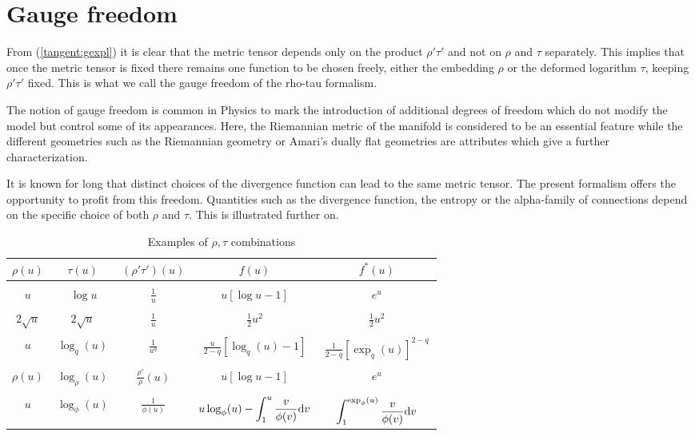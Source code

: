 \documentclass[graybox]{svmult}
\newcommand{\upd}{{\rm d}}
\begin{document}
\section{Gauge freedom}
\label{sect:gauge}


From (\ref {tangent:gexpl}) it is clear that the metric tensor depends only
on the product $\rho'\tau'$ and not on $\rho$ and $\tau$ separately.
This  implies that once the metric tensor is fixed there remains one 
function to be chosen freely, either the embedding $\rho$ or the 
deformed logarithm $\tau$, keeping $\rho'\tau'$ fixed.
This is what we call the gauge freedom of the rho-tau formalism.

The notion of gauge freedom is common in Physics to mark the
introduction of additional degrees of freedom which do not modify the model
but control some of its appearances. Here, the Riemannian metric of the
manifold is considered to be an essential feature while the different geometries
such as the Riemannian geometry or Amari's dually flat geometries are attributes
which give a further characterization.

It is known for long that distinct choices of the divergence function
can lead to the same metric tensor. The present formalism offers
the opportunity to profit from this freedom. Quantities such as
the divergence function, the entropy or the alpha-family
of connections depend on the specific choice of both $\rho$ and $\tau$.
This is illustrated further on.


\begin{table}
\begin{center}
\begin{tabular}{|c|c|c|c|c|}
\hline
$\rho(u)$\,&$\tau(u)$\, &$(\rho'\tau')(u)$\, &$f(u)$\, &$f^*(u)$\,\\\hline
 &  &  &  & \\
$u$\,&$\log u$  &$\displaystyle \frac 1u$\, &$u[\log u-1]$\, &$e^u$\,\\
 &  &  &  & \\
$2\sqrt u$\,&$2\sqrt u$\, &$\displaystyle \frac 1u$\, &$\displaystyle \frac 12 u^2$\, &$\displaystyle \frac 12 u^2$\,\\
 &  &  &  & \\
$u$\,&$\log_q (u)$\, &$\displaystyle \frac 1{u^q}$\, 
    &$\displaystyle \frac u{2-q}\left[\log_q(u)-1\right]$\, &$\frac 1{2-q}\left[\exp_q(u)\right]^{2-q}$\,\\
 &  &  &  & \\
$\rho(u)$\,&$\log_\rho(u)$\, &$\displaystyle \frac{\rho'}{\rho}(u)$\, &$u[\log u -1]$\, &$e^u$\,\\
 &  &  &  & \\
$u$\,&$\log_\phi(u)$\, &$\displaystyle\frac{1}{\phi(u)}$\,
&$\displaystyle u\log_\phi(u)-\int_1^u\frac{v}{\phi(v)}\upd v$\,
&$\displaystyle\int_1^{\exp_\phi(u)}\frac{v}{\phi(v)}\upd v$\, \\
\hline
\end{tabular}
\caption{Examples of $\rho,\tau$ combinations}
\end{center}
\end{table}
\end{document}
